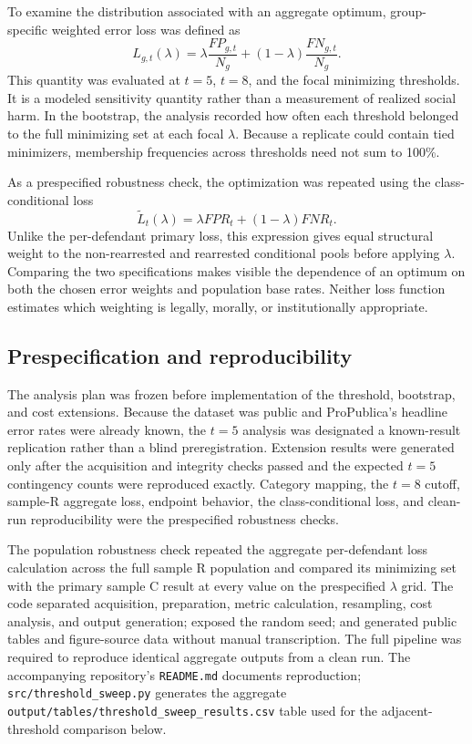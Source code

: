 \documentclass[11pt,letterpaper]{article}
\begin{document}
To examine the distribution associated with an aggregate optimum, group-specific weighted error loss was defined as
\[
L_{g,t}(\lambda)
=\lambda\frac{FP_{g,t}}{N_g}+(1-\lambda)\frac{FN_{g,t}}{N_g}.
\]
This quantity was evaluated at $t=5$, $t=8$, and the focal minimizing thresholds. It is a modeled sensitivity quantity rather than a measurement of realized social harm. In the bootstrap, the analysis recorded how often each threshold belonged to the full minimizing set at each focal $\lambda$. Because a replicate could contain tied minimizers, membership frequencies across thresholds need not sum to 100\%.

As a prespecified robustness check, the optimization was repeated using the class-conditional loss
\[
\widetilde{L}_t(\lambda)=\lambda FPR_t+(1-\lambda)FNR_t.
\]
Unlike the per-defendant primary loss, this expression gives equal structural weight to the non-rearrested and rearrested conditional pools before applying $\lambda$. Comparing the two specifications makes visible the dependence of an optimum on both the chosen error weights and population base rates. Neither loss function estimates which weighting is legally, morally, or institutionally appropriate.

\subsection{Prespecification and reproducibility}

The analysis plan was frozen before implementation of the threshold, bootstrap, and cost extensions. Because the dataset was public and ProPublica's headline error rates were already known, the $t=5$ analysis was designated a known-result replication rather than a blind preregistration. Extension results were generated only after the acquisition and integrity checks passed and the expected $t=5$ contingency counts were reproduced exactly. Category mapping, the $t=8$ cutoff, sample-R aggregate loss, endpoint behavior, the class-conditional loss, and clean-run reproducibility were the prespecified robustness checks.

The population robustness check repeated the aggregate per-defendant loss calculation across the full sample R population and compared its minimizing set with the primary sample C result at every value on the prespecified $\lambda$ grid. The code separated acquisition, preparation, metric calculation, resampling, cost analysis, and output generation; exposed the random seed; and generated public tables and figure-source data without manual transcription. The full pipeline was required to reproduce identical aggregate outputs from a clean run. The accompanying repository's \texttt{README.md} documents reproduction; \texttt{src/threshold\_sweep.py} generates the aggregate \texttt{output/tables/threshold\_sweep\_results.csv} table used for the adjacent-threshold comparison below.
\end{document}

